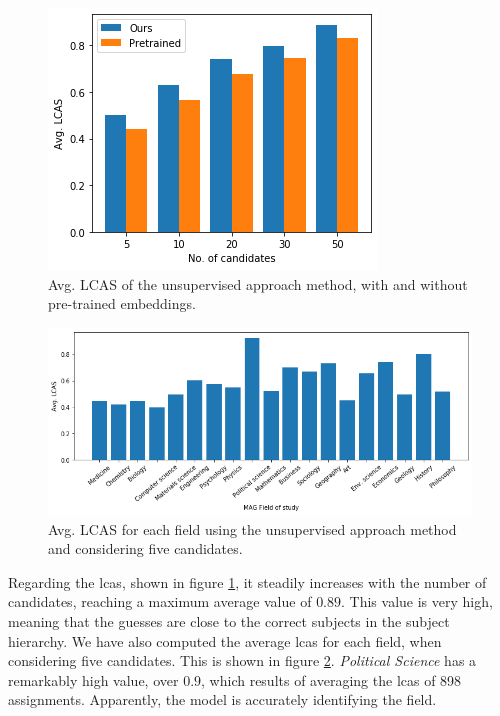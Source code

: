 \begin{figure}
    \centering
    \includegraphics[width=.7\textwidth]{figures/unsupervised_approach/results/avg_lcas.png}
    \caption{Avg. LCAS of the unsupervised approach method, with and without pre-trained embeddings.}
    \label{fig:avg_lcas}
\end{figure}

\begin{figure}
    \centering
    \includegraphics[width=\textwidth]{figures/unsupervised_approach/results/field_lcas.png}
    \caption{Avg. LCAS for each field using the unsupervised approach method and considering five candidates.}
    \label{fig:field_lcas}
\end{figure}

Regarding the \acrfull{lcas}, shown in figure \ref{fig:avg_lcas}, it steadily increases with the number of candidates, reaching a maximum average value of $0.89$. This value is very high, meaning that the guesses are close to the correct subjects in the subject hierarchy. We have also computed the average \acrshort{lcas} for each field, when considering five candidates. This is shown in figure \ref{fig:field_lcas}. \textit{Political Science} has a remarkably high value, over $0.9$, which results of averaging the \acrshort{lcas} of 898 assignments. Apparently, the model is accurately identifying the field.


